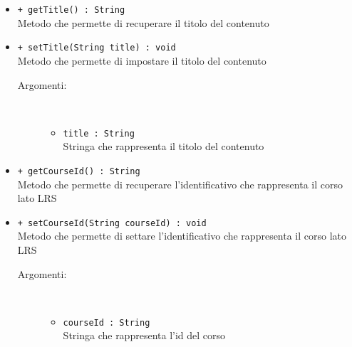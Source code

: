 \documentclass[../Tesi.tex]{subfiles}
\begin{document}
\begin{description}
\begin{itemize}
				\item \texttt{+ getTitle() : String}\\
				Metodo che permette di recuperare il titolo del contenuto

				\item \texttt{+ setTitle(String title) : void}\\
				Metodo che permette di impostare il titolo del contenuto
				\begin{description}
					\item[Argomenti:] \
					\begin{itemize}
						\item \texttt{title : String}\\
						Stringa che rappresenta il titolo del contenuto
					\end{itemize}
				\end{description}

				\item \texttt{+ getCourseId() : String}\\
				Metodo che permette di recuperare l'identificativo che rappresenta il corso lato LRS

				\item \texttt{+ setCourseId(String courseId) : void}\\
				Metodo che permette di settare l'identificativo che rappresenta il corso lato LRS
				\begin{description}
					\item[Argomenti:] \
					\begin{itemize}
						\item \texttt{courseId : String}\\
						Stringa che rappresenta l'id del corso
					\end{itemize}
				\end{description}
			\end{itemize}
		\end{description}

\end{document}
